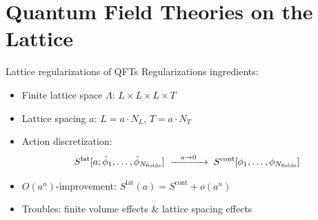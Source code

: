 \documentclass{beamer}
\begin{document}
\section{Quantum Field Theories on the Lattice}

\begin{frame}{Lattice regularizations of QFTs}
      Regularizations ingredients:
      \begin{itemize}
            \item Finite lattice space $\Lambda$: $L \times L \times L \times T$
            \item Lattice spacing $a$: $L = a\cdot N_L$, $T = a\cdot N_T$
            \item Action discretization:
            \begin{equation*}
                  S^\text{lat}[a;\tilde\phi_1,\dots,\tilde\phi_{N_\text{fields}}] \hspace*{1mm} \xrightarrow{\hspace*{3mm} a \rightarrow 0\hspace*{3mm}} \hspace*{1mm} S^\text{cont}[\phi_1,\dots,\phi_{N_\text{fields}}]
            \end{equation*}
            \item $O(a^n)$-improvement:  $S^\text{lat}(a) = S^\text{cont} + o(a^{n})$
            \item Troubles: finite volume effects \& lattice spacing effects
      \end{itemize}
\end{frame}
\end{document}

